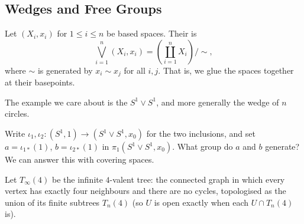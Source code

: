 \documentclass[a4paper]{scrartcl}
\begin{document}
\subsection{Wedges and Free Groups}

\begin{definition}[Wedge]
	Let $(X_i, x_i)$ for $1 \leq i \leq n$ be based spaces. Their  is
	$$
	\bigvee_{i=1}^n (X_i, x_i) = \left(\coprod_{i=1}^n X_i\right)\Big/\!\sim,
	$$
	where $\sim$ is generated by $x_i \sim x_j$ for all $i, j$. That is, we glue the spaces together at their basepoints.
\end{definition}

The example we care about is the  $S^1 \vee S^1$, and more generally
the wedge of $n$ circles.

\begin{center}
\end{center}

Write $\iota_1, \iota_2: (S^1, 1) \to (S^1 \vee S^1, x_0)$ for the two inclusions, and set
$a = \iota_{1*}(1)$, $b = \iota_{2*}(1)$ in $\pi_1(S^1 \vee S^1, x_0)$. What group do
$a$ and $b$ generate? We can answer this with covering spaces.

Let $T_\infty(4)$ be the infinite $4$-valent tree: the connected graph in which every
vertex has exactly four neighbours and there are no cycles, topologised as the union of
its finite subtrees $T_n(4)$ (so $U$ is open exactly when each $U \cap T_n(4)$ is).

\begin{center}
\end{center}
\end{document}
